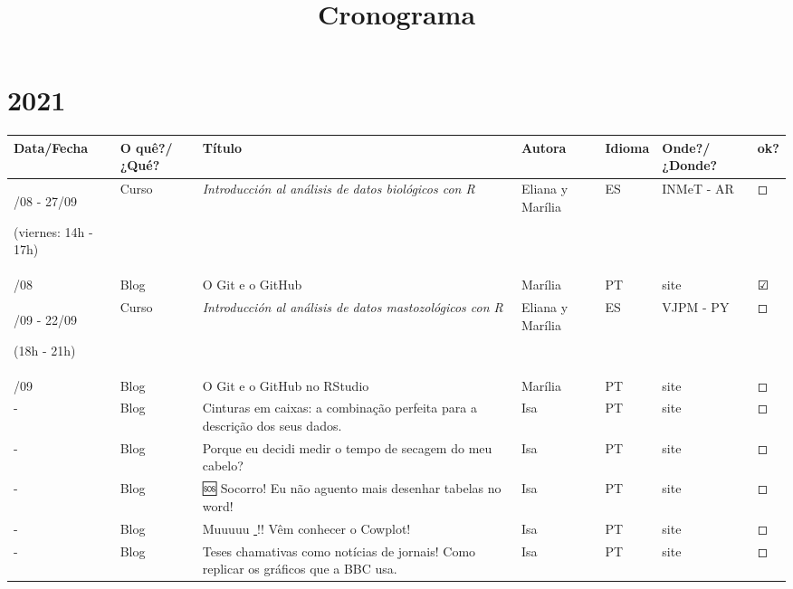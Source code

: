 \documentclass[
]{article}
\title{Cronograma}
\author{}
\date{\vspace{-2.5em}}
\begin{document}
\maketitle

\hypertarget{section}{%
\section{2021}\label{section}}

\begin{longtable}[]{@{}
  >{\raggedright\arraybackslash}p{}
  >{\raggedright\arraybackslash}p{}
  >{\raggedright\arraybackslash}p{}
  >{\raggedright\arraybackslash}p{}
  >{\raggedright\arraybackslash}p{}
  >{\raggedright\arraybackslash}p{}
  >{\raggedright\arraybackslash}p{}@{}}
\toprule
Data/Fecha & O quê?/¿Qué? & Título & Autora & Idioma & Onde?/¿Donde? &
ok? \\
\midrule
\endhead
16/08 - 27/09

(viernes: 14h - 17h) & Curso & \emph{Introducción al análisis de datos
biológicos con R} & Eliana y Marília & ES & INMeT - AR & ◻ \\
17/08 & Blog & O Git e o GitHub & Marília & PT & site & ☑ \\
18/09 - 22/09

(18h - 21h) & Curso & \emph{Introducción al análisis de datos
mastozológicos con R} & Eliana y Marília & ES & VJPM - PY & ◻ \\
30/09 & Blog & O Git e o GitHub no RStudio & Marília & PT & site & ◻ \\
- & Blog & Cinturas em caixas: a combinação perfeita para a descrição
dos seus dados.~ & Isa & PT & site & ◻ \\
- & Blog & Porque eu decidi medir o tempo de secagem do meu cabelo? &
Isa & PT & site & ◻ \\
- & Blog & 🆘 Socorro! Eu não aguento mais desenhar tabelas no word!~ &
Isa & PT & site & ◻ \\
- & Blog & Muuuuu \href{https://emojiterra.com/pt/vaca/}{🐄}!! Vêm
conhecer o Cowplot! & Isa & PT & site & ◻ \\
- & Blog & Teses chamativas como notícias de jornais! Como replicar os
gráficos que a BBC usa. & Isa & PT & site & ◻ \\
\bottomrule
\end{longtable}
\end{document}
